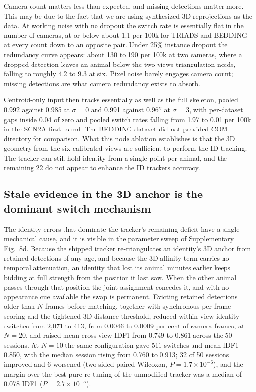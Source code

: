 \documentclass[pdflatex, sn-nature]{sn-jnl}
\theoremstyle{thmstyleone}%
\theoremstyle{thmstyletwo}%
\theoremstyle{thmstylethree}%
\begin{document}
Camera count matters less than expected, and missing detections matter more. This may be due to the fact that we are using synthesized 3D reprojections as the data. At working noise with no dropout the switch rate is essentially flat in the number of cameras, at or below about 1.1 per 100k for TRIADS and BEDDING at every count down to an opposite pair. Under 25\% instance dropout the redundancy curve appears: about 130 to 190 per 100k at two cameras, where a dropped detection leaves an animal below the two views triangulation needs, falling to roughly 4.2 to 9.3 at six. Pixel noise barely engages camera count; missing detections are what camera redundancy exists to absorb.

Centroid-only input then tracks essentially as well as the full skeleton, pooled 0.992 against 0.985 at $\sigma = 0$ and 0.991 against 0.967 at $\sigma = 3$, with per-dataset gaps inside 0.04 of zero and pooled switch rates falling from 1.97 to 0.01 per 100k in the SCN2A first round. The BEDDING dataset did not provided COM directory for comparison. What this node ablation establishes is that the 3D geometry from the six calibrated views are sufficient to perform the ID tracking. The tracker can still hold identity from a single point per animal, and the remaining 22 do not appear to enhance the ID trackers accuracy. 

\subsection{Stale evidence in the 3D anchor is the dominant switch mechanism}\label{subsec2-9}

The identity errors that dominate the tracker's remaining deficit have a single mechanical cause, and it is visible in the parameter sweep of Supplementary Fig.~8d. Because the shipped tracker re-triangulates an identity's 3D anchor from retained detections of any age, and because the 3D affinity term carries no temporal attenuation, an identity that lost its animal minutes earlier keeps bidding at full strength from the position it last saw. When the other animal passes through that position the joint assignment concedes it, and with no appearance cue available the swap is permanent. Evicting retained detections older than $N$ frames before matching, together with synchronous per-frame scoring and the tightened 3D distance threshold, reduced within-view identity switches from 2,071 to 413, from 0.0046 to 0.0009 per cent of camera-frames, at $N = 20$, and raised mean cross-view IDF1 from 0.749 to 0.861 across the 50 sessions. At $N = 10$ the same configuration gave 511 switches and mean IDF1 0.850, with the median session rising from 0.760 to 0.913; 32 of 50 sessions improved and 6 worsened (two-sided paired Wilcoxon, $P = 1.7 \times 10^{-6}$), and the margin over the best pure re-tuning of the unmodified tracker was a median of 0.078 IDF1 ($P = 2.7 \times 10^{-5}$).
\end{document}
